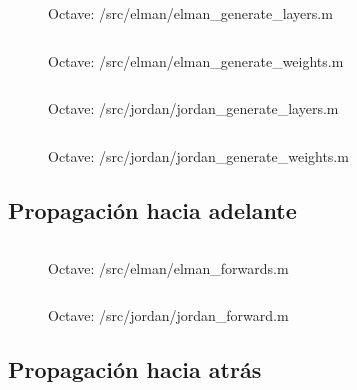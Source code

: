 \documentclass[10pt, a4paper,spanish]{article}
\begin{document}
			\begin{figure}[htpb!]
				\centering
				\inputminted{octave}{../src/elman/elman_generate_layers.m}
				\caption{Octave: /src/elman/elman\_generate\_layers.m}
				\label{code:jordan_generate_layers}
			\end{figure}

			\begin{figure}[htpb!]
				\centering
				\inputminted{octave}{../src/elman/elman_generate_weights.m}
				\caption{Octave: /src/elman/elman\_generate\_weights.m}
				\label{code:elman_generate_weights}
			\end{figure}

			\begin{figure}[htpb!]
				\centering
				\inputminted{octave}{../src/jordan/jordan_generate_layers.m}
				\caption{Octave: /src/jordan/jordan\_generate\_layers.m}
				\label{code:jordan_generate_layers}
			\end{figure}

			\begin{figure}[htpb!]
				\centering
				\inputminted{octave}{../src/jordan/jordan_generate_weights.m}
				\caption{Octave: /src/jordan/jordan\_generate\_weights.m}
				\label{code:jordan_generate_weights}
			\end{figure}


		\subsection{Propagación hacia adelante}
			\paragraph{}

			\begin{figure}[htpb!]
				\centering
				\inputminted{octave}{../src/elman/elman_forward.m}
				\caption{Octave: /src/elman/elman\_forwards.m}
				\label{code:elman_forward}
			\end{figure}

			\begin{figure}[htpb!]
				\centering
				\inputminted{octave}{../src/jordan/jordan_forward.m}
				\caption{Octave: /src/jordan/jordan\_forward.m}
				\label{code:jordan_forward}
			\end{figure}

		\subsection{Propagación hacia atrás}
\end{document}

